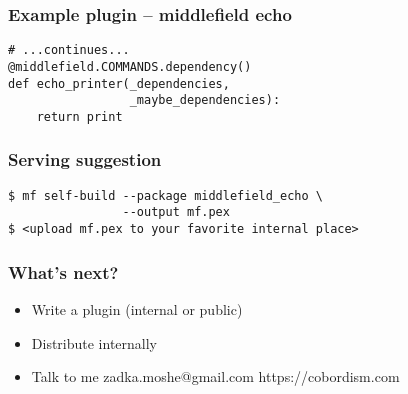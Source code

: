 \documentclass{beamer}
\begin{document}
\begin{frame}[fragile]
\frametitle{Example plugin -- middlefield echo}
\begin{lstlisting}
# ...continues...
@middlefield.COMMANDS.dependency()
def echo_printer(_dependencies,
                 _maybe_dependencies):
    return print
\end{lstlisting}
\end{frame}

\begin{frame}[fragile]
\frametitle{Serving suggestion}
\begin{lstlisting}
$ mf self-build --package middlefield_echo \
                --output mf.pex
$ <upload mf.pex to your favorite internal place>
\end{lstlisting}
\end{frame}

\begin{frame}
\frametitle{What's next?}
\begin{itemize}
\item Write a plugin (internal or public) \pause
\item Distribute internally \pause
\item Talk to me \pause zadka.moshe@gmail.com \pause https://cobordism.com
\end{itemize}
\end{frame}
\end{document}
